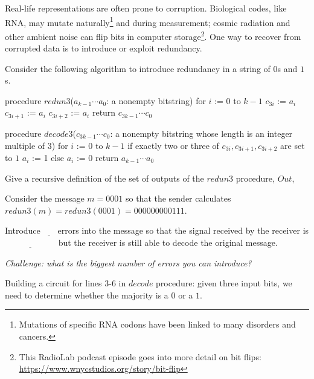 
Real-life representations are often prone to corruption.  Biological codes, like RNA, 
may mutate naturally\footnote{Mutations of specific RNA codons have been linked to many disorders and cancers.}
and during measurement; cosmic radiation and other ambient noise 
can flip bits in computer storage\footnote{This RadioLab podcast episode
goes into more detail on bit flips: \url{https://www.wnycstudios.org/story/bit-flip}}. 
One way to recover from corrupted data is to introduce or exploit redundancy. 

Consider the following algorithm to introduce redundancy in a string of $0$s and $1$s.
\begin{algorithm}[caption={Create redundancy by repeating each bit three times}]
procedure $\textit{redun3}$($a_{k-1} \cdots a_0$: a nonempty bitstring)
for $i$ := $0$ to $k-1$
  $c_{3i}$ := $a_i$
  $c_{3i+1}$ := $a_i$
  $c_{3i+2}$ := $a_i$
return $c_{3k-1} \cdots c_0$
\end{algorithm}

\begin{algorithm}[caption={Decode sequence of bits using majority rule on consecutive three bit sequences}]
procedure $\textit{decode3}$($c_{3k-1} \cdots c_0$: a nonempty bitstring whose length is an integer multiple of $3$)
for $i$ := $0$ to $k-1$
  if exactly two or three of $c_{3i}, c_{3i+1}, c_{3i+2}$ are set to $1$
    $a_i$ := 1
  else 
    $a_i$ := 0
return $a_{k-1} \cdots a_0$
\end{algorithm}

Give a recursive definition of the set of outputs of the $redun3$ procedure, $Out$,



Consider the message $m = 0001$ so that the sender calculates $redun3(m) = redun3(0001) = 000000000111$.

Introduce $\underline{\phantom{~~4~~}} $
errors into the message so that the signal received by the 
receiver is $\underline{\phantom{010100010101}}$
but the receiver is still able to decode the original message.


{\it Challenge: what is the biggest number of errors you can introduce?} 

Building a circuit for lines 3-6 in $decode$ procedure: given three input bits, we need to determine whether the
majority is a $0$ or a $1$.

